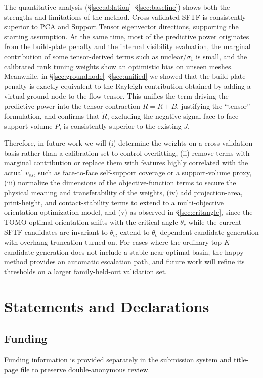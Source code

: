 \documentclass[11pt,a4paper]{article}
\begin{document}
The quantitative analysis (\S\ref{sec:ablation}--\S\ref{sec:baseline}) shows both the strengths and limitations of the method.
Cross-validated SFTF is consistently superior to PCA and Support Tensor eigenvector directions, supporting the starting assumption.
At the same time, most of the predictive power originates from the build-plate penalty and the internal visibility evaluation,
the marginal contribution of some tensor-derived terms such as nuclear/$\sigma_1$ is small, and
the calibrated rank tuning weights show an optimistic bias on unseen meshes.
Meanwhile, in \S\ref{sec:groundnode}--\S\ref{sec:unified} we showed that the build-plate penalty is exactly equivalent
to the Rayleigh contribution obtained by adding a virtual ground node to the flow tensor.
This unifies the term driving the predictive power into the tensor contraction $\tilde R=R+B$, justifying the ``tensor'' formulation,
and confirms that $\tilde R$, excluding the negative-signal face-to-face support volume $P$, is consistently superior to the existing $J$.

Therefore, in future work we will (i) determine the weights on a cross-validation basis rather than a calibration set to control overfitting,
(ii) remove terms with marginal contribution or replace them with features highly correlated with the actual $v_{ss}$,
such as face-to-face self-support coverage or a support-volume proxy,
(iii) normalize the dimensions of the objective-function terms to secure the physical meaning and transferability of the weights,
(iv) add projection-area, print-height, and contact-stability terms to extend to a multi-objective orientation optimization model, and
(v) as observed in \S\ref{sec:critangle}, since the TOMO optimal orientation shifts with the critical angle $\theta_c$ while
the current SFTF candidates are invariant to $\theta_c$, extend to $\theta_c$-dependent candidate generation with overhang truncation turned on.
For cases where the ordinary top-$K$ candidate generation does not include a stable near-optimal basin,
the happy-method provides an automatic escalation path, and future work will refine its thresholds on a larger family-held-out validation set.

\section*{Statements and Declarations}

\subsection*{Funding}
Funding information is provided separately in the submission system and title-page file to preserve double-anonymous review.
\end{document}
